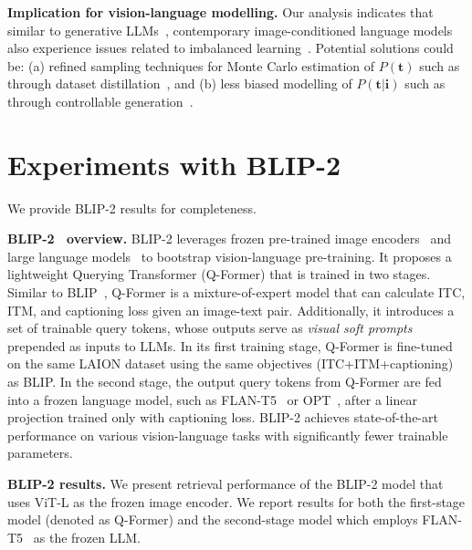 \documentclass{article} \usepackage{iclr2024_conference,times}
\begin{document}
{\bf Implication for vision-language modelling.} Our analysis indicates that similar to generative LLMs~\citep{pmimt1, pmimt2}, contemporary image-conditioned language models also experience issues related to imbalanced learning~\citep{kang2019decoupling}. Potential solutions could be: (a) refined sampling techniques for Monte Carlo estimation of $P(\mathbf{t})$ such as through dataset distillation~\citep{wu2023multimodal}, and (b) less biased modelling of $P(\mathbf{t}|\mathbf{i})$ such as through controllable generation~\citep{keskar2019ctrl}.







\section{Experiments with BLIP-2}
\label{app:blip_2}
We provide BLIP-2 results for completeness.

{\bf BLIP-2~\citep{blip2} overview.} BLIP-2 leverages frozen pre-trained image encoders~\citep{fang2022eva} and large language models~\citep{flan, opt} to bootstrap vision-language pre-training. It proposes a lightweight Querying Transformer (Q-Former) that is trained in two stages. Similar to BLIP~\citep{blip}, Q-Former is a mixture-of-expert model that can calculate ITC, ITM, and captioning loss given an image-text pair. Additionally, it introduces a set of trainable query tokens, whose outputs serve as {\em visual soft prompts} prepended as inputs to LLMs. In its first training stage, Q-Former is fine-tuned on the same LAION dataset using the same objectives (ITC+ITM+captioning) as BLIP. In the second stage, the output query tokens from Q-Former are fed into a frozen language model, such as FLAN-T5~\citep{flan} or OPT~\citep{flan}, after a linear projection trained only with captioning loss. BLIP-2 achieves state-of-the-art performance on various vision-language tasks with significantly fewer trainable parameters.  


{\bf BLIP-2 results.} We present retrieval performance of the BLIP-2 model that uses ViT-L as the frozen image encoder. We report results for both the first-stage model (denoted as Q-Former) and the second-stage model which employs FLAN-T5~\citep{flan} as the frozen LLM. 
\end{document}
